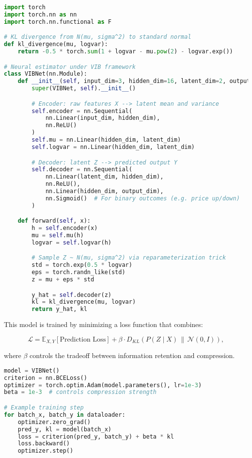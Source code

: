 \begin{lstlisting}[language=Python, caption={Minimal Variational Information Bottleneck in PyTorch}, label={lst:vib_model}]
import torch
import torch.nn as nn
import torch.nn.functional as F

# KL divergence from N(mu, sigma^2) to standard normal
def kl_divergence(mu, logvar):
    return -0.5 * torch.sum(1 + logvar - mu.pow(2) - logvar.exp())

# Neural estimator under VIB framework
class VIBNet(nn.Module):
    def __init__(self, input_dim=3, hidden_dim=16, latent_dim=2, output_dim=1):
        super(VIBNet, self).__init__()

        # Encoder: raw features X --> latent mean and variance
        self.encoder = nn.Sequential(
            nn.Linear(input_dim, hidden_dim),
            nn.ReLU()
        )
        self.mu = nn.Linear(hidden_dim, latent_dim)
        self.logvar = nn.Linear(hidden_dim, latent_dim)

        # Decoder: latent Z --> predicted output Y
        self.decoder = nn.Sequential(
            nn.Linear(latent_dim, hidden_dim),
            nn.ReLU(),
            nn.Linear(hidden_dim, output_dim),
            nn.Sigmoid()  # For binary outcomes (e.g. price up/down)
        )

    def forward(self, x):
        h = self.encoder(x)
        mu = self.mu(h)
        logvar = self.logvar(h)

        # Sample Z ~ N(mu, sigma^2) via reparameterization trick
        std = torch.exp(0.5 * logvar)
        eps = torch.randn_like(std)
        z = mu + eps * std

        y_hat = self.decoder(z)
        kl = kl_divergence(mu, logvar)
        return y_hat, kl
\end{lstlisting}

\noindent
This model is trained by minimizing a loss function that combines:

\[
\mathcal{L} = \mathbb{E}_{X, Y}[\text{Prediction Loss}] + \beta \cdot D_{KL}(P(Z \mid X) \,\|\, \mathcal{N}(0, I)),
\]

where \( \beta \) controls the tradeoff between information retention and compression.

\begin{lstlisting}[language=Python, caption={Training loop with KL regularization}, label={lst:train_loop}]
model = VIBNet()
criterion = nn.BCELoss()
optimizer = torch.optim.Adam(model.parameters(), lr=1e-3)
beta = 1e-3  # controls compression strength

# Example training step
for batch_x, batch_y in dataloader:
    optimizer.zero_grad()
    pred_y, kl = model(batch_x)
    loss = criterion(pred_y, batch_y) + beta * kl
    loss.backward()
    optimizer.step()
\end{lstlisting}

